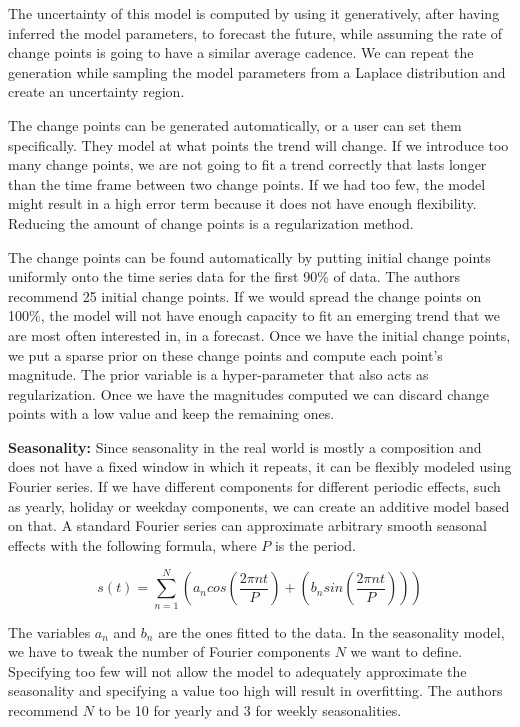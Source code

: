 The uncertainty of this model is computed by using it generatively, after having inferred the model parameters, to forecast the future, while assuming the rate of change points is going to have a similar average cadence. We can repeat the generation while sampling the model parameters from a Laplace distribution and create an uncertainty region.

The change points can be generated automatically, or a user can set them specifically. They model at what points the trend will change. If we introduce too many change points, we are not going to fit a trend correctly that lasts longer than the time frame between two change points. If we had too few, the model might result in a high error term because it does not have enough flexibility. Reducing the amount of change points is a regularization method.

The change points can be found automatically by putting initial change points uniformly onto the time series data for the first 90\% of data. The authors recommend 25 initial change points. If we would spread the change points on 100\%, the model will not have enough capacity to fit an emerging trend that we are most often interested in, in a forecast. Once we have the initial change points, we put a sparse prior on these change points and compute each point's magnitude. The prior variable is a hyper-parameter that also acts as regularization. Once we have the magnitudes computed we can discard change points with a low value and keep the remaining ones.

\textbf{Seasonality:} Since seasonality in the real world is mostly a composition and does not have a fixed window in which it repeats, it can be flexibly modeled using Fourier series. If we have different components for different periodic effects, such as yearly, holiday or weekday components, we can create an additive model based on that. A standard Fourier series can approximate arbitrary smooth seasonal effects with the following formula, where \(P\) is the period.

\begin{equation}
    s(t)=\sum\limits_{n=1}^N (a_n cos(\frac{2\pi nt}{P})+(b_n sin(\dfrac{2\pi nt}{P})))
    \label{eq:prophetSeasonality}
\end{equation}

The variables \(a_n\) and \(b_n\) are the ones fitted to the data. In the seasonality model, we have to tweak the number of Fourier components \(N\) we want to define. Specifying too few will not allow the model to adequately approximate the seasonality and specifying a value too high will result in overfitting. The authors recommend \(N\) to be 10 for yearly and 3 for weekly seasonalities.



